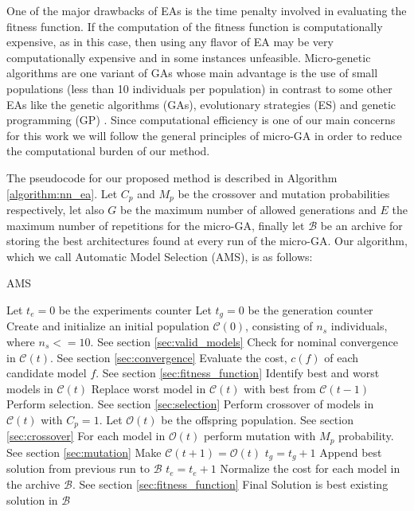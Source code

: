 \documentclass[journal]{IEEEtran}
\begin{document}
One of the major drawbacks of EAs is the time penalty involved in evaluating the fitness function. If the computation of the fitness function is computationally expensive, as in this case, then using any flavor of EA may be very computationally expensive and in some instances unfeasible. Micro-genetic algorithms \cite{Krishnakumar1989} are one variant of GAs whose main advantage is the use of small populations (less than 10 individuals per population) in contrast to some other EAs like the genetic algorithms (GAs), evolutionary strategies (ES) and genetic programming (GP) \cite{Engelbrecht2007}. Since computational efficiency is one of our main concerns for this work we will follow the general principles of micro-GA in order to reduce the computational burden of our method. 

The pseudocode for our proposed method is described in Algorithm \ref{algorithm:nn_ea}. Let $C_p$ and $M_p$ be the crossover and mutation probabilities respectively, let also $G$ be the maximum number of allowed generations and $E$ the maximum number of repetitions for the micro-GA, finally let $\mathcal{B}$ be an archive for storing the best architectures found at every run of the micro-GA. Our algorithm, which we call Automatic Model Selection (AMS), is as follows:

\begin{algorithm}[!htb]
\caption{AMS}
\begin{algorithmic}
\State Let $t_e = 0$ be the experiments counter
	\State Let $t_g = 0$ be the generation counter
	\State Create and initialize an initial population $\mathcal{C}(0)$, consisting of $n_s$ individuals, where $n_s <= 10$. See section \ref{sec:valid_models}
		\State Check for nominal convergence in $\mathcal{C}(t)$. See section \ref{sec:convergence}
		\State Evaluate the cost, $c(f)$ of each candidate model $f$. See section \ref{sec:fitness_function}
		\State Identify best and worst models in $\mathcal{C}(t)$
		\State Replace worst model in $\mathcal{C}(t)$ with best from $\mathcal{C}(t-1)$
		\State Perform selection. See section \ref{sec:selection}
		\State Perform crossover of models in $\mathcal{C}(t)$ with $C_p=1$. Let $\mathcal{O}(t)$ be the offspring population. See section \ref{sec:crossover}
		\State For each model in $\mathcal{O}(t)$ perform mutation with $M_p$ probability. See section \ref{sec:mutation}
		\State Make $\mathcal{C}(t+1) = \mathcal{O}(t)$ 
	    \State $t_g = t_g + 1$
	\EndWhile
	 \State Append best solution from previous run to $\mathcal{B}$
	 \State $t_e = t_e + 1$
\EndWhile
\State Normalize the cost for each model in the archive $\mathcal{B}$. See section \ref{sec:fitness_function}
\State Final Solution is best existing solution in $\mathcal{B}$
\end{algorithmic}
\label{algorithm:nn_ea}
\end{algorithm}
\end{document}
